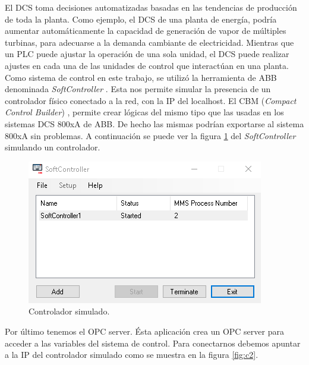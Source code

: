 \vspace{70px}

El DCS toma decisiones automatizadas basadas en las tendencias de producción de toda la planta. Como ejemplo, el DCS de una planta de energía, podría aumentar automáticamente la capacidad de generación de vapor de múltiples turbinas, para adecuarse a la demanda cambiante de electricidad. Mientras que un PLC puede ajustar la operación de una sola unidad, el DCS puede realizar ajustes en cada una de las unidades de control que interactúan en una planta.\\

Como sistema de control en este trabajo, se utilizó la herramienta de ABB denominada \textit{SoftController} \citep{softc}. Esta nos permite simular la presencia de un controlador físico conectado a la red, con la IP del localhost. El CBM (\textit{Compact Control Builder}) \citep{cbm}, permite crear lógicas del mismo tipo que las usadas en los sistemas DCS 800xA de ABB. De hecho las mismas podrían exportarse al sistema 800xA sin problemas. A continuación se puede ver la figura \ref{fig:c1} del \textit{SoftController} simulando un controlador.

\begin{figure}[htpb]
	\centering
	\includegraphics[scale=.6]{./Figures/c1.png}
	\caption{Controlador simulado\protect\footnotemark.}
	\label{fig:c1}
\end{figure}

Por último tenemos el OPC server. Ésta aplicación crea un OPC server para acceder a las variables del sistema de control. Para conectarnos debemos apuntar a la IP del controlador simulado como se muestra en la figura \ref{fig:c2}.

